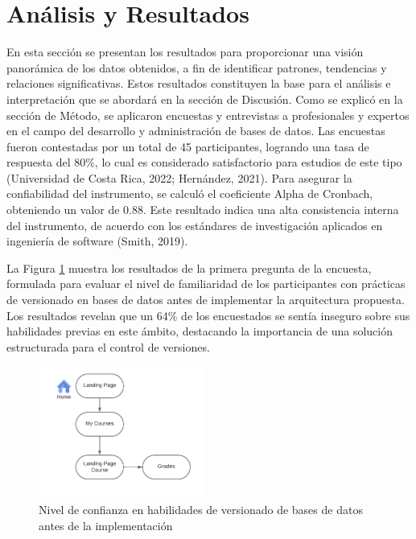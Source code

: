 \documentclass{IEEEtran}
\begin{document}
\section{Análisis y Resultados}
En esta sección se presentan los resultados para proporcionar una visión panorámica de los datos obtenidos, a fin de identificar patrones, tendencias y relaciones significativas. Estos resultados constituyen la base para el análisis e interpretación que se abordará en la sección de Discusión. Como se explicó en la sección de Método, se aplicaron encuestas y entrevistas a profesionales y expertos en el campo del desarrollo y administración de bases de datos. Las encuestas fueron contestadas por un total de 45 participantes, logrando una tasa de respuesta del 80\%, lo cual es considerado satisfactorio para estudios de este tipo (Universidad de Costa Rica, 2022; Hernández, 2021). Para asegurar la confiabilidad del instrumento, se calculó el coeficiente Alpha de Cronbach, obteniendo un valor de 0.88. Este resultado indica una alta consistencia interna del instrumento, de acuerdo con los estándares de investigación aplicados en ingeniería de software (Smith, 2019).

La Figura \ref{fig:figure1} muestra los resultados de la primera pregunta de la encuesta, formulada para evaluar el nivel de familiaridad de los participantes con prácticas de versionado en bases de datos antes de implementar la arquitectura propuesta. Los resultados revelan que un 64\% de los encuestados se sentía inseguro sobre sus habilidades previas en este ámbito, destacando la importancia de una solución estructurada para el control de versiones.

\begin{figure}[H]
    \centering
    \includegraphics[width=0.48\textwidth]{images/figure1.png}
    \caption{Nivel de confianza en habilidades de versionado de bases de datos antes de la implementación}
    \label{fig:figure1}
\end{figure}
\end{document}
